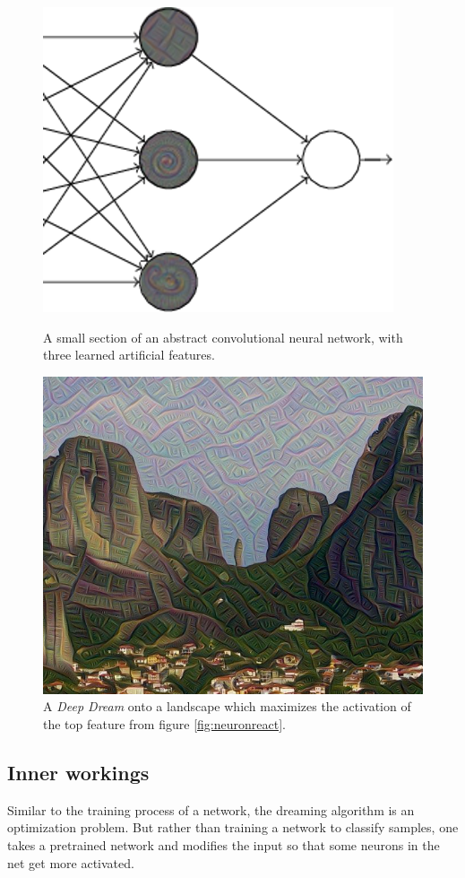 \begin{figure}[H]
	\centering
	\includegraphics[width=0.5\linewidth]{img/neurons-reaction.png}
	\caption{A small section of an abstract convolutional neural network, with three learned artificial features.\cite{nielsen2015neural}}
	\label{fig:neuronreact}
	\endminipage\hfill
	\centering
	\includegraphics[width=0.7\linewidth]{img/applied_neuron2.jpg}
	\caption{A \textit{Deep Dream} onto a landscape which maximizes the activation of the top feature from figure \ref{fig:neuronreact}.\cite{imgmeteora}}
	\label{fig:applieddream}
	\endminipage\hfill
\end{figure}




\subsection{Inner workings}
Similar to the training process of a network, the dreaming algorithm is an optimization problem.
But rather than training a network to classify samples, one takes a pretrained network and modifies the input so that some neurons in the net get more activated.


